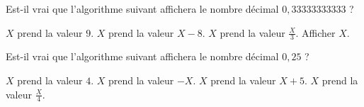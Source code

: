 
\begin{multicols}{2}
    \algoname{}
    Est-il vrai que l'algorithme suivant affichera le nombre décimal $0,\!33333333333$ ?
    \bigskip
    \begin{myverb}
\(X\) prend la valeur \(9\).
\(X\) prend la valeur \(X-8\).
\(X\) prend la valeur \(\frac{X}{3}\).
Afficher \(X\).
    \end{myverb}

    \switchcol

    \algoname{}
    Est-il vrai que l'algorithme suivant affichera le nombre décimal $0,\!25$ ?
    \bigskip
    \begin{myverb}
\(X\) prend la valeur \(4\).
\(X\) prend la valeur \(-X\).
\(X\) prend la valeur \(X+5\).
\(X\) prend la valeur \(\frac{X}{4}\).
    \end{myverb}
\end{multicols}